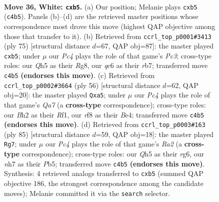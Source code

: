 \documentclass[11pt]{article}
\begin{document}
\clearpage

\begin{figure}[p]\centering
\begin{subfigure}{0.46\textwidth}\centering
\resizebox{\linewidth}{!}{%
\newchessgame
\chessboard[
  setfen={5rk1/7n/2q5/ppp4Q/2P2p2/1P3R2/P2r3B/1R4K1 w - - 0 36},
  showmover=false,
  pgfstyle=straightmove, color=movearrow, markmove={c4-b5}
]}
\caption{}
\end{subfigure}\hfill
\begin{subfigure}{0.46\textwidth}\centering
\resizebox{\linewidth}{!}{%
\newchessgame
\chessboard[
  setfen={6rk/1R6/p1p5/PPPp2p1/3P1b1q/4p3/6RP/5Q1K b - - 0 38},
  showmover=false,
  pgfstyle=straightmove, color=movearrow, markmove={c6-b5}
]}
\caption{}
\end{subfigure}
\\[4pt]
\begin{subfigure}{0.46\textwidth}\centering
\resizebox{\linewidth}{!}{%
\newchessgame
\chessboard[
  setfen={3q2k1/Q1r2p1p/7P/p3p1r1/4B3/4P3/3P2P1/5RK1 w - - 3 29},
  showmover=false,
  pgfstyle=straightmove, color=movearrow, markmove={a7-a5}
]}
\caption{}
\end{subfigure}\hfill
\begin{subfigure}{0.46\textwidth}\centering
\resizebox{\linewidth}{!}{%
\newchessgame
\chessboard[
  setfen={5rk1/r7/6R1/PpPp4/2pP1p1P/4q1P1/5R2/1Q4K1 b - - 1 43},
  showmover=false,
  pgfstyle=straightmove, color=movearrow, markmove={a7-g7}
]}
\caption{}
\end{subfigure}
\caption{\textbf{Move 36, White: \texttt{cxb5}.} (a) Our position; Melanie plays \texttt{cxb5} (\texttt{c4b5}). Panels (b)--(d) are the retrieved master positions whose correspondence most drove this move (highest QAP objective among those that transfer to it). (b) Retrieved from \texttt{ccrl\_top\_p0001\#3413} (ply 75) [structural distance $d$=67, QAP obj=87]: the master played \texttt{cxb5}; under $\mu$ our \emph{Pc4} plays the role of that game's \emph{Pc3}; cross-type roles: our \emph{Q}h5 as their \emph{R}g8, our \emph{q}c6 as their \emph{r}b7; transferred move \texttt{c4b5} \textbf{(endorses this move)}. (c) Retrieved from \texttt{ccrl\_top\_p0002\#3664} (ply 56) [structural distance $d$=62, QAP obj=20]: the master played \texttt{Qxa5}; under $\mu$ our \emph{Pc4} plays the role of that game's \emph{Qa7} (a \textbf{cross-type} correspondence); cross-type roles: our \emph{B}h2 as their \emph{R}f1, our \emph{r}f8 as their \emph{B}e4; transferred move \texttt{c4b5} \textbf{(endorses this move)}. (d) Retrieved from \texttt{ccrl\_top\_p0003\#163} (ply 85) [structural distance $d$=59, QAP obj=18]: the master played \texttt{Rg7}; under $\mu$ our \emph{Pc4} plays the role of that game's \emph{Ra2} (a \textbf{cross-type} correspondence); cross-type roles: our \emph{Q}h5 as their \emph{r}g6, our \emph{n}h7 as their \emph{P}b5; transferred move \texttt{c4b5} \textbf{(endorses this move)}. Synthesis: 4 retrieved analogs transferred to \texttt{cxb5} (summed QAP objective 186, the strongest correspondence among the candidate moves); Melanie committed it via the \texttt{search} selector.}
\label{fig:thought-m70}
\end{figure}
\end{document}
